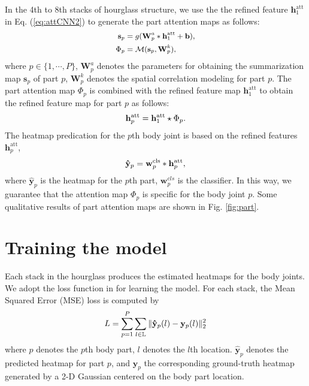 \documentclass[10pt,twocolumn,letterpaper]{article}
\begin{document}
In the 4th to 8th stacks of hourglass structure, we use the the refined feature $\mathbf{h}_1^{\text{att}}$ in Eq. (\ref{eq:attCNN2}) to generate the part attention maps as follows:
\begin{equation}\small
\begin{split}
   \mathbf{s}_p & =g(\mathbf{W}^{a}_p * \mathbf{h}^{\text{att}}_1+\mathbf{b}), \\
   \Phi_{p} & = \mathcal{M}(\mathbf{s}_p, \mathbf{W}^{k}_p),
\label{eq:attPart}
\end{split}
\end{equation}
where $p \in\{1,\cdots, P\}$, 
$\mathbf{W}^a_{p}$ denotes the parameters for obtaining the summarization map $\mathbf{s}_p$ of part $p$,
$\mathbf{W}^k_{p}$ denotes the spatial correlation modeling for part $p$.
The part attention map $\Phi_{p}$ is combined with the refined  feature map $\mathbf{h}_1^{\text{att}}$ to obtain the refined  feature map for part $p$ as follows:
\begin{equation}\small
    \mathbf{h}_{p}^{\text{att}}=\mathbf{h}_1^{\text{att}} \star \Phi_{p}.
\end{equation}
The heatmap predication for the $p$th body joint is based on the refined  features $\mathbf{h}_{p}^{\text{att}}$,
\begin{equation}\small
   \mathbf{\hat{y}}_{p} = \mathbf{w}_p^{\text{cls}} * \mathbf{h}_{p}^{\text{att}},
\end{equation}
where $\mathbf{\hat{y}}_{p}$ is the heatmap for the $p$th part, $\mathbf{w}_p^{cls}$ is the classifier. 
In this way, we guarantee that the attention map $\Phi_{p}$ is specific for the body joint $p$. 
Some qualitative results of part attention maps are shown in Fig. \ref{fig:part}.



\section{Training the model}
Each stack in the hourglass produces the estimated heatmaps for the body joints.
We adopt the loss function in \cite{newell2016stacked} for learning the model. For each stack, the Mean Squared Error (MSE) loss is computed by
\begin{align}\small
L = \sum_{p=1}^{P} \sum_{l\in \mathbb{L}} \|\mathbf{\hat{y}}_{p} (l) - \mathbf{y}_{p} (l)\|_2^2
\end{align}
where $p$ denotes the $p$th body part, $l$ denotes the $l$th location.  $\mathbf{\hat{y}}_{p}$ denotes the predicted heatmap for part $p$, and $\mathbf{y}_{p}$ the corresponding ground-truth heatmap generated by a 2-D Gaussian centered on the body part location. 
\end{document}
